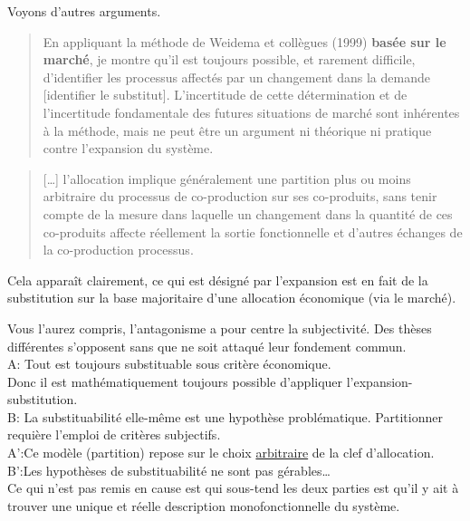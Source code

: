 Voyons d'autres arguments.
\blockcquote[traduction]{weidema_avoiding_2010}{
En appliquant la méthode de Weidema et collègues (1999) \textbf{basée sur le marché}, je montre qu'il est toujours possible, et rarement difficile, d'identifier les processus affectés par un changement dans la demande [identifier le substitut]. L'incertitude de cette détermination et de l'incertitude fondamentale des futures situations de marché sont inhérentes à la méthode, mais ne peut être un argument ni théorique ni pratique contre l'expansion du système.}
\blockcquote[traduction]{weidema_avoiding_2010}{
[\ldots] l'allocation implique généralement une partition plus ou moins arbitraire du processus de co-production sur ses co-produits, sans tenir compte de la mesure dans laquelle un changement dans la quantité de ces co-produits affecte réellement la sortie fonctionnelle et d'autres échanges de la co-production processus.
}
Cela apparaît clairement, ce qui est désigné par l'expansion est en fait de la substitution sur la base majoritaire d'une allocation économique (via le marché).

Vous l'aurez compris, l'antagonisme a pour centre la subjectivité.
Des thèses différentes s'opposent sans que ne soit attaqué leur fondement commun.\\
A: Tout est toujours substituable sous critère économique.\\
Donc il est mathématiquement toujours possible d'appliquer l'expansion-substitution.\\
B: La substituabilité elle-même est une hypothèse problématique. Partitionner requière l'emploi de critères subjectifs.\\
A':Ce modèle (partition) repose sur le choix \href{http://www.cnrtl.fr/definition/arbitraire}{arbitraire} de la clef d'allocation.\\
B':Les hypothèses de substituabilité ne sont pas gérables\ldots\\
Ce qui n'est pas remis en cause est qui sous-tend les deux parties est qu'il y ait à trouver une unique et réelle description monofonctionnelle du système.


